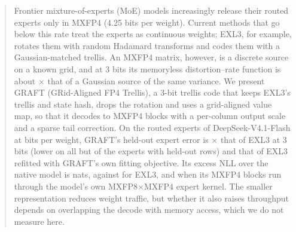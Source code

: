 \begin{abstract}
Frontier mixture-of-experts (MoE) models increasingly release their routed experts only in MXFP4 (4.25 bits per
weight). Current methods that go below this rate treat the experts as continuous weights; EXL3, for example, rotates
them with
random Hadamard transforms and codes them with a Gaussian-matched trellis. An MXFP4 matrix, however, is a discrete
source on a known grid, and at 3 bits its memoryless distortion--rate function is about $\times$
that of a Gaussian source of the same variance. We present GRAFT (GRid-Aligned FP4 Trellis), a 3-bit trellis code that
keeps EXL3's trellis and state hash, drops the rotation and uses a grid-aligned value map, so that it decodes to MXFP4
blocks with a per-column output scale and a sparse tail correction. On the routed experts of DeepSeek-V4.1-Flash at
 bits per weight, GRAFT's held-out expert error is $\times$ that of EXL3 at 3 bits
(lower on all but  of the  experts with held-out rows) and  that of EXL3
refitted with GRAFT's own fitting objective. Its excess NLL over the native model is  nats, against
 for EXL3, and  when its MXFP4 blocks run through the model's own MXFP8$\times$MXFP4 expert
kernel. The smaller representation reduces weight traffic, but whether it also raises throughput depends on
overlapping the decode with memory access, which we do not measure here.
\end{abstract}
